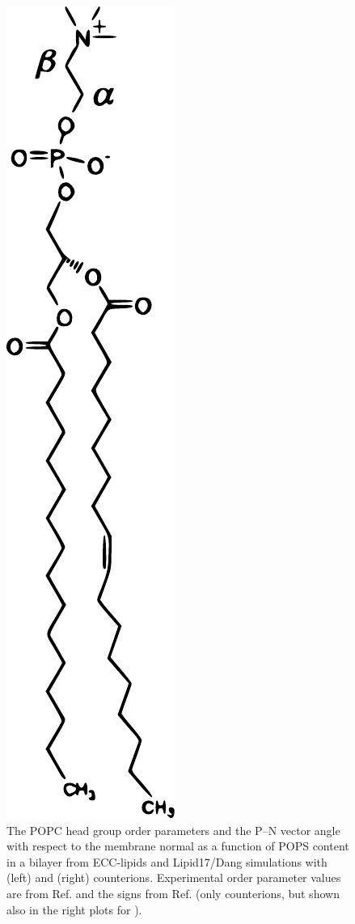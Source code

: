 \documentclass[journal=jpcbfk,manuscript=article]{achemso}
\newlength{\figheightsmall}
\newlength{\figheight}
\begin{document}
\begin{figure}[!tbp]
  \includegraphics[height=\figheightsmall]{../img/POPCstructure.pdf} 
  \caption{\label{fig:delta_ordPar_NaCl_PC-PS_mix_PC} 
    The POPC head group order parameters and the P--N vector angle
    with respect to the membrane normal as a function of POPS content in a bilayer
    from ECC-lipids and Lipid17/Dang simulations with  (left) and  (right) counterions.
    Experimental order parameter values are from Ref. 
    and the signs from Ref.  
    (only  counterions, but shown also in the right plots for ).
  }
\end{figure} 
\end{document}
